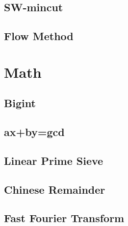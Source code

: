 \documentclass[a4paper,10pt,twocolumn,oneside]{article}
\begin{document}
%

\subsection{SW-mincut}


\subsection{Flow Method}


\section{Math}

\subsection{Bigint}


\subsection{ax+by=gcd}


\subsection{Linear Prime Sieve}


% 

\subsection{Chinese Remainder}


\subsection{Fast Fourier Transform}

\end{document}
